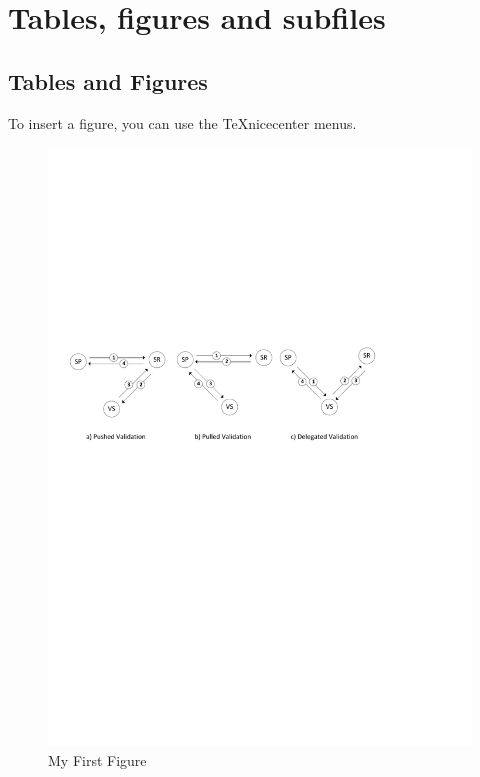 \documentclass{beamer}
\begin{document}
\section{Tables, figures and subfiles}\label{sec:background}
\subsection{Tables and Figures}

\begin{frame}
To insert a figure, you can use the TeXnicecenter menus. 
\begin{figure}
	\centering
	\includegraphics[width=1.00\linewidth]{att-models-base.pdf}
	\caption{My First Figure}
	\label{fig:att-models-base}
\end{figure}
\end{frame}
\end{document}
